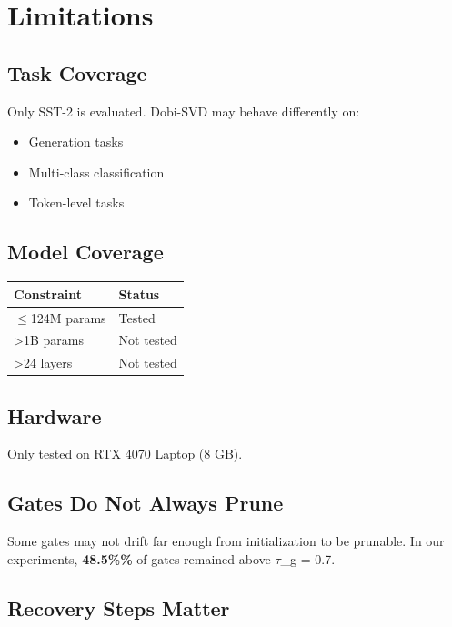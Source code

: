 
\section{Limitations}

\subsection{Task Coverage}

Only SST-2 is evaluated. Dobi-SVD may behave differently on:
\begin{itemize}
\item Generation tasks
\item Multi-class classification
\item Token-level tasks

\end{itemize}
\subsection{Model Coverage}

\begin{table}[H]
\centering
\small
\begin{tabular}{ll}
\toprule
\textbf{Constraint} & \textbf{Status} \\
\midrule
$\le$124M params & Tested \\
\textgreater{}1B params & Not tested \\
\textgreater{}24 layers & Not tested \\
\bottomrule
\end{tabular}
\end{table}

\subsection{Hardware}

Only tested on RTX 4070 Laptop (8 GB).

\subsection{Gates Do Not Always Prune}

Some gates may not drift far enough from initialization to be prunable. In 
our experiments, \textbf{48.5\%\%} of gates remained above $\tau$\_g = 0.7.

\subsection{Recovery Steps Matter}

